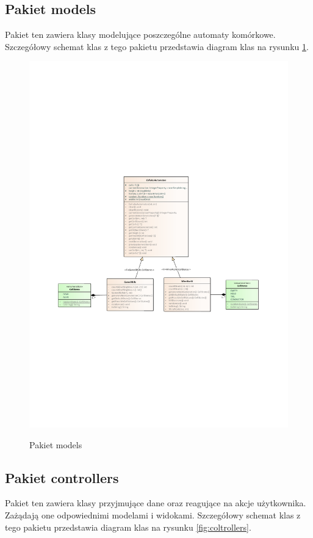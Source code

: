 \documentclass{report}
\begin{document}
\subsection{Pakiet models}
Pakiet ten zawiera klasy modelujące poszczególne automaty komórkowe.
Szczegółowy schemat klas z tego pakietu przedstawia diagram klas na rysunku \ref{fig:models}.

\begin{figure}
	\centering
	\vspace{-6cm}
	\caption{Pakiet models}
	\hspace*{-3cm}\includegraphics[width=20cm]{Pakiet_models}
	\label{fig:models}
\end{figure}

\subsection{Pakiet controllers}
Pakiet ten zawiera klasy przyjmujące dane oraz reagujące na akcje użytkownika. Zażądają one odpowiednimi modelami i widokami.
Szczegółowy schemat klas z tego pakietu przedstawia diagram klas na rysunku \ref{fig:coltrollers}.
\end{document}
